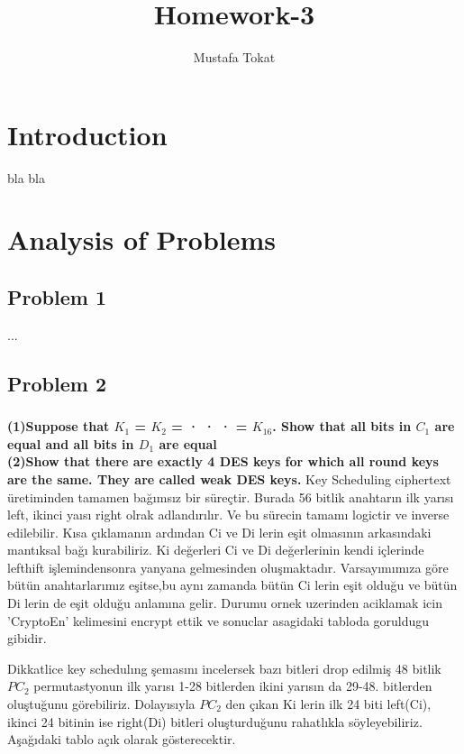 \documentclass[11pt]{article}
\begin{document}
\title{Homework-3}
\author{Mustafa Tokat}
\maketitle
\section{Introduction}
bla bla

\section{Analysis of Problems}
\subsection{Problem 1}

...

\subsection{Problem 2}
\subsubsection{}
\textbf{(1)Suppose that $K_{1}$ = $K_{2}$ = · · · = $K_{16}$. Show that all bits in $C_{1}$ are equal and all bits in $D_{1}$
are equal}\\
\textbf{(2)Show that there are exactly 4 DES keys for which all round keys are the same. They are
called weak DES keys.} 
Key Scheduling ciphertext üretiminden tamamen bağımsız bir süreçtir. Burada 56 bitlik anahtarın ilk yarısı left, 
ikinci yaısı right olrak adlandırılır. Ve bu sürecin tamamı logictir ve inverse edilebilir. Kısa çıklamanın ardından 
Ci ve Di lerin eşit olmasının arkasındaki mantıksal bağı kurabiliriz.  Ki değerleri Ci ve Di değerlerinin kendi içlerinde
 lefthift işlemindensonra yanyana gelmesinden oluşmaktadır.
Varsayımımıza göre bütün anahtarlarımız eşitse,bu aynı zamanda bütün Ci lerin eşit olduğu ve bütün Di lerin de eşit olduğu  anlamına gelir. 
Durumu ornek uzerinden aciklamak icin 'CryptoEn' kelimesini encrypt ettik ve sonuclar asagidaki tabloda goruldugu gibidir.

Dikkatlice key schedulıng şemasını incelersek  bazı bitleri drop edilmiş 48 bitlik $PC_{2}$ permutastyonun 
 ilk yarısı 1-28 bitlerden ikini yarısın da 29-48. bitlerden oluştuğunu görebiliriz. Dolayısıyla $PC_{2}$ den çıkan
  Ki lerin ilk 24 biti left(Ci), ikinci 24 bitinin ise right(Di) bitleri oluşturduğunu rahatlıkla söyleyebiliriz.
Aşağıdaki tablo açık olarak gösterecektir. 
\end{document}
